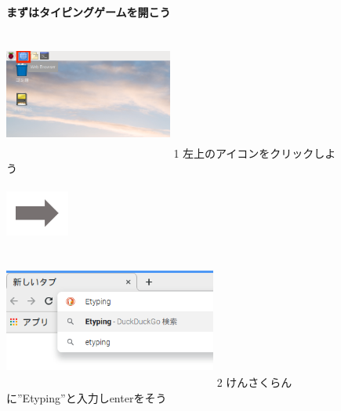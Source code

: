 \documentclass[a4paper,12pt]{jarticle}
\begin{document}
\begin{figure}[t]
  \centering


  {\centering
    \textbf{まずはタイピングゲームを開こう}
    \par}

  \centering

  \begin{minipage}{5.695cm}
    \includegraphics[width=5.523cm,height=4.249cm]{textbook-img071.png}
    1 左上のアイコンをクリックしよう
  \end{minipage}
  \includegraphics[width=2.094cm,height=1.771cm]{textbook-img084.png}
  \begin{minipage}{6.582cm}
    \includegraphics[width=6.985cm,height=4.479cm]{textbook-img083.png}
    2 けんさくらんに”Etyping”と入力しenterをそう
  \end{minipage}



\end{figure}
\end{document}
